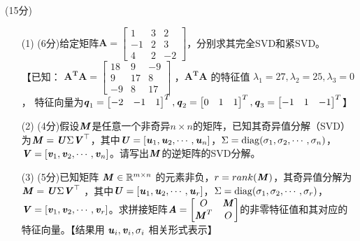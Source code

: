 \documentclass[12pt,a4paper,openany,twoside]{ctexbook}
\begin{document}
\begin{exercise}\quad(15分)
	\begin{itemize}
		\item [(1)] (6分)给定矩阵$\mathbf{A}=\begin{bmatrix}  
			1 & 3 & 2 \\  
			-1 & 2 & 3 \\  
			4 & 2 & -2  
			\end{bmatrix}  $，分别求其完全SVD和紧SVD。\\
			【已知： $\mathbf{A^T A}=\begin{bmatrix}  
			18 & 9 & -9 \\  
			9 & 17 & 8 \\  
			-9 & 8 & 17  
			\end{bmatrix}  $ ，$\mathbf{A^T A}$ 的特征值 $\lambda_1=27,\lambda_2=25,\lambda_3=0$，
			特征向量为$\Vq_1=\begin{bmatrix}  
			-2 & -1 & 1 
			\end{bmatrix}^T,\Vq_2=\begin{bmatrix}  
			0 & 1 & 1 
			\end{bmatrix}^T,\Vq_3=\begin{bmatrix}  
			-1 & 1 & -1 
			\end{bmatrix}^T$】
		\item [(2)] (4分)假设$\MM$是任意一个非奇异$n \times n$的矩阵，已知其奇异值分解（SVD）为$\MM = \MU \Sigma \MV^\top$，其中$\MU = [\Vu_1, \Vu_2, \cdots, \Vu_n]$，$\Sigma = \diag(\sigma_1, \sigma_2, \cdots, \sigma_n)$，$\MV = [\Vv_1, \Vv_2, \cdots, \Vv_n]$。请写出$\MM$的逆矩阵的SVD分解。
		\item [(3)] (5分)已知矩阵 $\MM \in \mathbb{R}^{m \times n} $ 的元素非负，$r=rank(\MM)$，其奇异值分解为 $\MM = \MU \Sigma \MV^\top$ ，其中$\MU = [\Vu_1, \Vu_2, \cdots, \Vu_r]$，$\Sigma = \diag(\sigma_1, \sigma_2, \cdots, \sigma_r)$，$\MV = [\Vv_1, \Vv_2, \cdots, \Vv_r]$。求拼接矩阵$\MA=\begin{bmatrix}  
			O & \MM \\  
			{\MM}^T & O 
			\end{bmatrix}$的非零特征值和其对应的特征向量。【结果用 $\Vu_i,\Vv_i,\sigma_i$ 相关形式表示】
	\end{itemize} 
\end{exercise}
\end{document}
